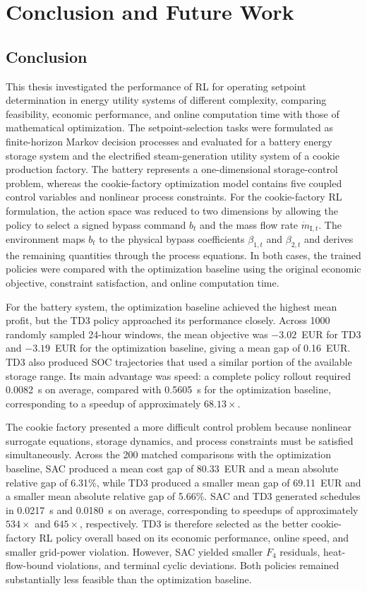 \documentclass[12pt]{article}
\newcommand{\startnewpage}{\clearpage}
\begin{document}
\startnewpage
\section{Conclusion and Future Work}
\label{sec:conclusion_future_work}

\subsection{Conclusion}

This thesis investigated the performance of RL for operating setpoint determination in energy utility systems of different complexity, comparing feasibility, economic performance, and online computation time with those of mathematical optimization. The setpoint-selection tasks were formulated as finite-horizon Markov decision processes and evaluated for a battery energy storage system and the electrified steam-generation utility system of a cookie production factory. The battery represents a one-dimensional storage-control problem, whereas the cookie-factory optimization model contains five coupled control variables and nonlinear process constraints. For the cookie-factory RL formulation, the action space was reduced to two dimensions by allowing the policy to select a signed bypass command $b_t$ and the mass flow rate $\dot{m}_{\mathrm{I},t}$. The environment maps $b_t$ to the physical bypass coefficients $\beta_{1,t}$ and $\beta_{2,t}$ and derives the remaining quantities through the process equations. In both cases, the trained policies were compared with the optimization baseline using the original economic objective, constraint satisfaction, and online computation time.

For the battery system, the optimization baseline achieved the highest mean profit, but the TD3 policy approached its performance closely. Across 1000 randomly sampled 24-hour windows, the mean objective was $-3.02$~EUR for TD3 and $-3.19$~EUR for the optimization baseline, giving a mean gap of 0.16~EUR. TD3 also produced SOC trajectories that used a similar portion of the available storage range. Its main advantage was speed: a complete policy rollout required 0.0082~s on average, compared with 0.5605~s for the optimization baseline, corresponding to a speedup of approximately $68.13\times$.

The cookie factory presented a more difficult control problem because nonlinear surrogate equations, storage dynamics, and process constraints must be satisfied simultaneously. Across the 200 matched comparisons with the optimization baseline, SAC produced a mean cost gap of 80.33~EUR and a mean absolute relative gap of 6.31\%, while TD3 produced a smaller mean gap of 69.11~EUR and a smaller mean absolute relative gap of 5.66\%. SAC and TD3 generated schedules in 0.0217~s and 0.0180~s on average, corresponding to speedups of approximately $534\times$ and $645\times$, respectively. TD3 is therefore selected as the better cookie-factory RL policy overall based on its economic performance, online speed, and smaller grid-power violation. However, SAC yielded smaller $F_4$ residuals, heat-flow-bound violations, and terminal cyclic deviations. Both policies remained substantially less feasible than the optimization baseline.
\end{document}
